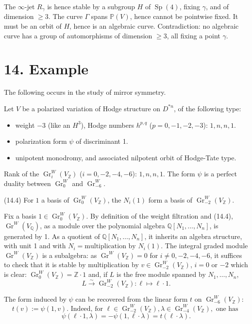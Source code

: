 \documentclass[11pt,a4paper]{article}
\theoremstyle{plain}
\theoremstyle{definition}
\DeclareMathOperator{\Gr}{Gr}
\DeclareMathOperator{\Sp}{Sp}
\begin{document}
The $\infty$-jet $R_{\gamma}$ is hence stable by a subgroup $H$ of $\Sp(4)$, fixing $\gamma$, and of dimension $\geq 3$. The curve $\Gamma$ spans $\mathbb{P}(V)$, hence cannot be pointwise fixed. It must be an orbit of $H$, hence is an algebraic curve. Contradiction: no algebraic curve has a group of automorphisms of dimension $\geq 3$, all fixing a point $\gamma$.

\section{14. Example}

The following occurs in the study of mirror symmetry.

Let $V$ be a polarized variation of Hodge structure on $D^{*n}$, of the following type:
\begin{itemize}
\item[(14.1)] weight $-3$ (like an $H^{3}$), Hodge numbers $h^{p,q}$ ($p = 0, -1, -2, -3$): $1, n, n, 1$.
\item[(14.2)] polarization form $\psi$ of discriminant 1.
\item[(14.3)] unipotent monodromy, and associated nilpotent orbit of Hodge-Tate type.
\end{itemize}

Rank of the $\Gr_{i}^{W}(V_{\mathbb{Z}})$ ($i = 0, -2, -4, -6$): $1, n, n, 1$. The form $\psi$ is a perfect duality between $\Gr_{0}^{W}$ and $\Gr_{-6}^{W}$.

(14.4) For $1$ a basis of $\Gr_{0}^{W}(V_{\mathbb{Z}})$, the $N_{i}(1)$ form a basis of $\Gr_{-2}^{W}(V_{\mathbb{Z}})$.

Fix a basis $1 \in \Gr_{0}^{W}(V_{\mathbb{Z}})$. By definition of the weight filtration and (14.4), $\Gr^{W}(V_{\mathbb{Q}})$, as a module over the polynomial algebra $\mathbb{Q}[N_{1}, \ldots, N_{n}]$, is generated by 1. As a quotient of $\mathbb{Q}[N_{1}, \ldots, N_{n}]$, it inherits an algebra structure, with unit 1 and with $N_{i} = \text{multiplication by } N_{i}(1)$. The integral graded module $\Gr^{W}(V_{\mathbb{Z}})$ is a subalgebra: as $\Gr^{W}(V_{\mathbb{Z}}) = 0$ for $i \neq 0, -2, -4, -6$, it suffices to check that it is stable by multiplication by $v \in \Gr_{-2}^{W}(V_{\mathbb{Z}})$, $i = 0$ or $-2$ which is clear: $\Gr_{0}^{W}(V_{\mathbb{Z}}) = \mathbb{Z} \cdot 1$ and, if $L$ is the free module spanned by $N_{1}, \ldots, N_{n}$,
\[
L \xrightarrow{\sim} \Gr_{-2}^{W}(V_{\mathbb{Z}}): \ell \mapsto \ell \cdot 1.
\]

The form induced by $\psi$ can be recovered from the linear form $t$ on $\Gr_{-6}^{W}(V_{\mathbb{Z}})$:
\[
t(v) := \psi(1, v). \text{ Indeed, for } \ell \in \Gr_{-2}^{W}(V_{\mathbb{Z}}), \lambda \in \Gr_{-4}^{W}(V_{\mathbb{Z}}), \text{ one has }
\]
\[
\psi(\ell \cdot 1, \lambda) = -\psi(1, \ell \cdot \lambda) = t(\ell \cdot \lambda).
\]
\end{document}
